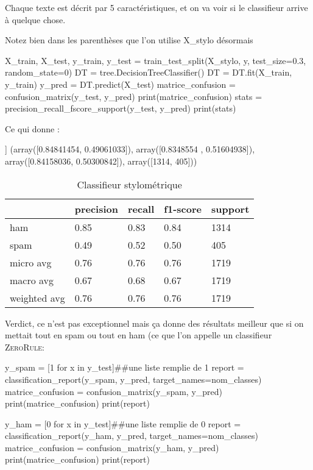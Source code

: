 Chaque texte est décrit par 5 caractéristiques, et on va voir si le classifieur arrive à quelque chose.

 Notez bien dans les parenthèses que l'on utilise X\_stylo désormais

\begin{python}
X_train, X_test, y_train, y_test = train_test_split(X_stylo, y, test_size=0.3, random_state=0)
DT = tree.DecisionTreeClassifier()
DT = DT.fit(X_train, y_train)
y_pred = DT.predict(X_test)
matrice_confusion = confusion_matrix(y_test, y_pred)
print(matrice_confusion)
stats = precision_recall_fscore_support(y_test, y_pred)
print(stats)
\end{python}

Ce qui donne :

\begin{python}
[[1097  217]
 [ 196  209]]
(array([0.84841454, 0.49061033]), 
 array([0.8348554 , 0.51604938]), 
 array([0.84158036, 0.50300842]), 
 array([1314,  405]))
\end{python}

\begin{table}[h]
\begin{center}
\begin{tabular}{lllll}
\hline
 &   precision& recall & f1-score &  support\\
\hline
	 ham&   0.85&  0.83&  0.84&  1314\\
	spam&   0.49&  0.52&  0.50&   405\\
\hline
   micro avg&   0.76&  0.76&  0.76&  1719\\
   macro avg&   0.67&  0.68&  0.67&  1719\\
weighted avg&   0.76&  0.76&  0.76&  1719\\
\hline
\end{tabular}
\caption{Classifieur stylométrique}
\end{center}
\end{table}


Verdict, ce n'est pas exceptionnel mais ça donne des résultats meilleur que si on mettait tout en spam ou tout en ham (ce que l'on appelle un classifieur \textsc{ZeroRule}:

\begin{python}
y_spam = [1 for x in y_test]##une liste remplie de 1
report = classification_report(y_spam, y_pred, target_names=nom_classes)
matrice_confusion = confusion_matrix(y_spam, y_pred)
print(matrice_confusion)
print(report)

y_ham = [0 for x in y_test]##une liste remplie de 0
report = classification_report(y_ham, y_pred, target_names=nom_classes)
matrice_confusion = confusion_matrix(y_ham, y_pred)
print(matrice_confusion)
print(report)
\end{python}

